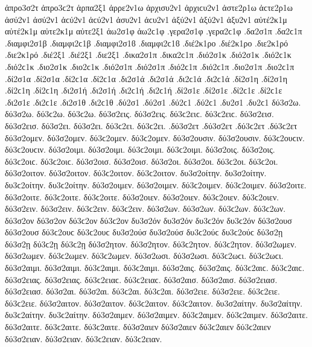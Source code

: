 {ἀπρο3σ2τ ἀπρο3ϲ2τ   %
ἁρπα2ξ1   %
ἀρρε2ν1ω   %
ἀρχισυ2ν1 ἀρχιϲυ2ν1   %
ἀστε2ρ1ω ἀϲτε2ρ1ω   %
ἀσύ2ν1 ἀσύ2ν1 ἀϲύ2ν1 ἀϲύ2ν1   %
ἀσυ2ν1 ἀϲυ2ν1
ἀξύ2ν1 ἀξύ2ν1   %
ἀξυ2ν1
αὐτέ2κ1μ αὐτέ2κ1μ   %
αὐτε2κ1μ
αὐτε2ξ1   %
ἀω2σ1φ ἀω2ϲ1φ   %
.γερα2σ1φ .γερα2ϲ1φ   %
.δα2σ1π .δα2ϲ1π   %
.διαμφι2σ1β .διαμφι2ϲ1β .διαμφι2σ1ϐ .διαμφι2ϲ1ϐ %
.διέ2κ1ρο .διέ2κ1ρο   %
.διε2κ1ρό .διε2κ1ρό
.διέ2ξ1 .διέ2ξ1   %
.διε2ξ1   %
.δικα2σ1π .δικα2ϲ1π   %
.διό2σ1κ .διό2σ1κ .διό2ϲ1κ .διό2ϲ1κ   %
.διο2σ1κ .διο2ϲ1κ
.διό2σ1π .διό2σ1π .διό2ϲ1π .διό2ϲ1π   %
.διο2σ1π .διο2ϲ1π
.δί2σ1α .δί2σ1α .δί2ϲ1α .δί2ϲ1α   %
.δι2σ1ά .δι2σ1ά .δι2ϲ1ά .δι2ϲ1ά
.δί2σ1η .δί2σ1η .δί2ϲ1η .δί2ϲ1η   %
.δι2σ1ή .δι2σ1ή .δι2ϲ1ή .δι2ϲ1ή
.δί2σ1ε .δί2σ1ε .δί2ϲ1ε .δί2ϲ1ε   %
.δι2σ1ε .δι2ϲ1ε
.δι2σ1θ .δι2ϲ1θ   %
.δύ2σ1 .δύ2σ1 .δύ2ϲ1 .δύ2ϲ1   %
.δυ2σ1 .δυ2ϲ1
%
δύ3σ2ω. δύ3σ2ω. δύ3ϲ2ω. δύ3ϲ2ω.   %
δύ3σ2εις. δύ3σ2εις. δύ3ϲ2ειϲ. δύ3ϲ2ειϲ.
δύ3σ2εισ. δύ3σ2εισ.
δύ3σ2ει. δύ3σ2ει. δύ3ϲ2ει. δύ3ϲ2ει.
.δύ3σ2ετ .δύ3σ2ετ .δύ3ϲ2ετ .δύ3ϲ2ετ
δύ3σ2ομεν. δύ3σ2ομεν. δύ3ϲ2ομεν. δύ3ϲ2ομεν.
δύ3σ2ουσιν. δύ3σ2ουσιν. δύ3ϲ2ουϲιν. δύ3ϲ2ουϲιν.
δύ3σ2οιμι. δύ3σ2οιμι. δύ3ϲ2οιμι. δύ3ϲ2οιμι.
δύ3σ2οις. δύ3σ2οις. δύ3ϲ2οιϲ. δύ3ϲ2οιϲ.
δύ3σ2οισ. δύ3σ2οισ.
δύ3σ2οι. δύ3σ2οι. δύ3ϲ2οι. δύ3ϲ2οι.
δύ3σ2οιτον. δύ3σ2οιτον. δύ3ϲ2οιτον. δύ3ϲ2οιτον.
δυ3σ2οίτην. δυ3σ2οίτην. δυ3ϲ2οίτην. δυ3ϲ2οίτην.
δύ3σ2οιμεν. δύ3σ2οιμεν. δύ3ϲ2οιμεν. δύ3ϲ2οιμεν.
δύ3σ2οιτε. δύ3σ2οιτε. δύ3ϲ2οιτε. δύ3ϲ2οιτε.
δύ3σ2οιεν. δύ3σ2οιεν. δύ3ϲ2οιεν. δύ3ϲ2οιεν.
δύ3σ2ειν. δύ3σ2ειν. δύ3ϲ2ειν. δύ3ϲ2ειν.
δύ3σ2ων. δύ3σ2ων. δύ3ϲ2ων. δύ3ϲ2ων. δύ3σ2ον δύ3σ2ον δύ3ϲ2ον δύ3ϲ2ον δυ3σ2όν δυ3σ2όν δυ3ϲ2όν δυ3ϲ2όν
δύ3σ2ουσ δύ3σ2ουσ δύ3ϲ2ουϲ δύ3ϲ2ουϲ δυ3σ2ούσ δυ3σ2ούσ δυ3ϲ2ούϲ δυ3ϲ2ούϲ
δύ3σ2ῃ δύ3σ2ῃ δύ3ϲ2ῃ δύ3ϲ2ῃ
δύ3σ2ητον. δύ3σ2ητον. δύ3ϲ2ητον. δύ3ϲ2ητον.
δύ3σ2ωμεν. δύ3σ2ωμεν. δύ3ϲ2ωμεν. δύ3ϲ2ωμεν.
δύ3σ2ωσι. δύ3σ2ωσι. δύ3ϲ2ωϲι. δύ3ϲ2ωϲι.
δύ3σ2αιμι. δύ3σ2αιμι. δύ3ϲ2αιμι. δύ3ϲ2αιμι.
δύ3σ2αις. δύ3σ2αις. δύ3ϲ2αιϲ. δύ3ϲ2αιϲ. δύ3σ2ειας. δύ3σ2ειας. δύ3ϲ2ειαϲ. δύ3ϲ2ειαϲ.
δύ3σ2αισ. δύ3σ2αισ. δύ3σ2ειασ. δύ3σ2ειασ.
δύ3σ2αι. δύ3σ2αι. δύ3ϲ2αι. δύ3ϲ2αι. δύ3σ2ειε. δύ3σ2ειε. δύ3ϲ2ειε. δύ3ϲ2ειε.
δύ3σ2αιτον. δύ3σ2αιτον. δύ3ϲ2αιτον. δύ3ϲ2αιτον.
δυ3σ2αίτην. δυ3σ2αίτην. δυ3ϲ2αίτην. δυ3ϲ2αίτην.
δύ3σ2αιμεν. δύ3σ2αιμεν. δύ3ϲ2αιμεν. δύ3ϲ2αιμεν.
δύ3σ2αιτε. δύ3σ2αιτε. δύ3ϲ2αιτε. δύ3ϲ2αιτε.
δύ3σ2αιεν δύ3σ2αιεν δύ3ϲ2αιεν δύ3ϲ2αιεν δύ3σ2ειαν. δύ3σ2ειαν. δύ3ϲ2ειαν. δύ3ϲ2ειαν.
}
